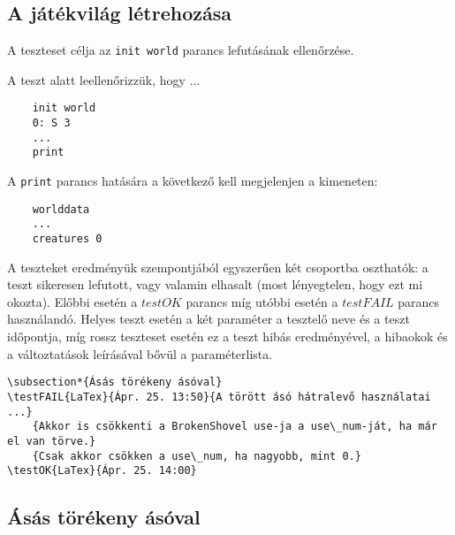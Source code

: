 \documentclass[]{article}
\begin{document}
\subsection*{A játékvilág létrehozása}
\begin{test-case-description}
    A teszteset célja az \texttt{init world} parancs lefutásának ellenőrzése.
\end{test-case-description}
\begin{test-case-function}
    A teszt alatt leellenőrizzük, hogy ...
\end{test-case-function}
\begin{test-case-input}
    \begin{verbatim}
    init world
    0: S 3
    ...
    print
    \end{verbatim}
\end{test-case-input}
\begin{test-case-output}
    A \texttt{print} parancs hatására a következő kell megjelenjen a kimeneten:
    \begin{verbatim}
    worlddata
    ...
    creatures 0
    \end{verbatim}
\end{test-case-output}
A teszteket eredményük szempontjából egyszerűen két csoportba oszthatók: a teszt sikeresen lefutott, vagy valamin elhasalt (most lényegtelen, hogy ezt mi okozta). Előbbi esetén a $testOK$ parancs míg utóbbi esetén a $testFAIL$ parancs használandó. Helyes teszt esetén a két paraméter a tesztelő neve és a teszt időpontja, míg rossz teszteset esetén ez a teszt hibás eredményével, a hibaokok és a változtatások leírásával bővül a paraméterlista.
\begin{lstlisting}
\subsection*{Ásás törékeny ásóval}
\testFAIL{LaTex}{Ápr. 25. 13:50}{A törött ásó hátralevő használatai ...}
    {Akkor is csökkenti a BrokenShovel use-ja a use\_num-ját, ha már el van törve.}
    {Csak akkor csökken a use\_num, ha nagyobb, mint 0.}
\testOK{LaTex}{Ápr. 25. 14:00}
\end{lstlisting}
\subsection*{Ásás törékeny ásóval}
\end{document}
